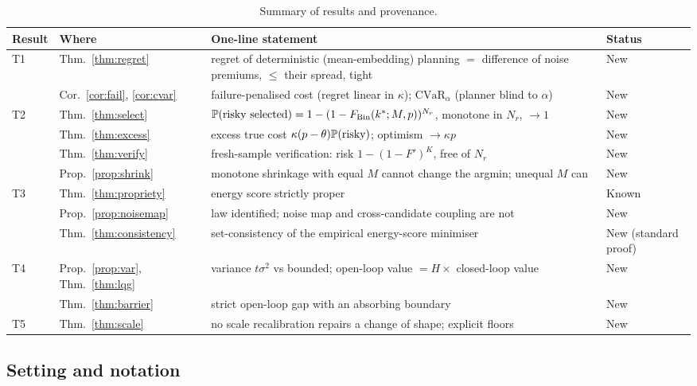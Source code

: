 \begin{table}[h]
\centering\footnotesize
\begin{tabular}{@{}lp{2.6cm}p{6.6cm}l@{}}
\hline
Result & Where & One-line statement & Status\\
\hline
T1 & Thm.~\ref{thm:regret} & regret of deterministic (mean-embedding) planning $=$ difference of noise premiums, $\le$ their spread, tight & New\\
   & Cor.~\ref{cor:fail}, \ref{cor:cvar} & failure-penalised cost (regret linear in $\kappa$); $\mathrm{CVaR}_\alpha$ (planner blind to $\alpha$) & New\\
T2 & Thm.~\ref{thm:select} & $\mathbb{P}(\text{risky selected})=1-(1-F_{\mathrm{Bin}}(k^*;M,p))^{N_r}$, monotone in $N_r$, $\to1$ & New\\
   & Thm.~\ref{thm:excess} & excess true cost $\kappa(p-\theta)\mathbb{P}(\text{risky})$; optimism $\to\kappa p$ & New\\
   & Thm.~\ref{thm:verify} & fresh-sample verification: risk $1-(1-F')^K$, free of $N_r$ & New\\
   & Prop.~\ref{prop:shrink} & monotone shrinkage with equal $M$ cannot change the argmin; unequal $M$ can & New\\
T3 & Thm.~\ref{thm:propriety} & energy score strictly proper & Known\\
   & Prop.~\ref{prop:noisemap} & law identified; noise map and cross-candidate coupling are not & New\\
   & Thm.~\ref{thm:consistency} & set-consistency of the empirical energy-score minimiser & New (standard proof)\\
T4 & Prop.~\ref{prop:var}, Thm.~\ref{thm:lqg} & variance $t\sigma^2$ vs bounded; open-loop value $=H\times$ closed-loop value & New\\
   & Thm.~\ref{thm:barrier} & strict open-loop gap with an absorbing boundary & New\\
T5 & Thm.~\ref{thm:scale} & no scale recalibration repairs a change of shape; explicit floors & New\\
\hline
\end{tabular}
\caption{Summary of results and provenance.}
\label{tab:summary}
\end{table}

\subsection{Setting and notation}\label{sec:setting}

